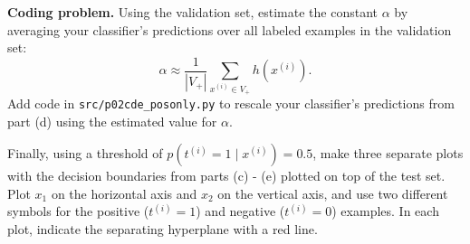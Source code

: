 \clearpage
\item {} \textbf{Coding problem.}
Using the validation set, estimate the constant $\alpha$ by averaging your
classifier's predictions over all labeled examples in the validation set:
%
\begin{equation*}
  \alpha \approx \frac{1}{|V_{+}|}\sum_{x^{(i)}\in V_{+}} h(x^{(i)}).
\end{equation*}
%
Add code in \texttt{src/p02cde\_posonly.py} to rescale your
classifier's predictions from part (d) using the estimated value for $\alpha$.

Finally, using a threshold of $p(t^{(i)} = 1 \mid x^{(i)}) = 0.5$, make three
separate plots with the decision boundaries from parts (c) - (e) plotted on top
of the test set. Plot $x_1$ on the horizontal axis and $x_2$ on the vertical
axis, and use two different symbols for the positive ($t^{(i)} = 1$) and
negative ($t^{(i)} = 0$) examples. In each plot, indicate the separating
hyperplane with a red line.

\ifnum{} {
  
} \fi
